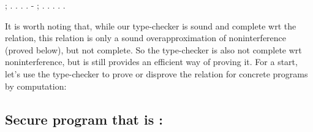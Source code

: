 \documentclass[12pt]{report}
\begin{document}
\begin{coqdoccode}
\coqdocindent{2.00em}
 ; .    .\coqdoceol
\coqdocindent{2.00em}
   . .\coqdoceol
\coqdocindent{1.00em}
-  ; .    .\coqdoceol
\coqdocindent{2.00em}
   . .\coqdoceol
\coqdocnoindent
{}.\coqdoceol
\coqdocemptyline
\end{coqdoccode}
It is worth noting that, while our type-checker is sound and
    complete wrt the  relation, this relation is only a
    sound overapproximation of noninterference (proved below), but not
    complete. So the type-checker is also not complete wrt
    noninterference, but is still provides an efficient way of proving
    it. For a start, let's use the type-checker to prove or disprove the
     relation for concrete programs by computation: 
\begin{coqdoccode}
\coqdocemptyline
\end{coqdoccode}
\subsection{Secure program that is \texorpdfstring{\protect{}}{cf\_well\_typed}:}
\end{document}
